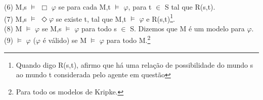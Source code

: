 \documentclass[12pt]{report}
\begin{document}
\indent (6) M,s $\vDash$ $\Box$ $\varphi$ se para cada M,t $\vDash$ $\varphi$, para t $\in$ S tal que 
R(s,t).\\
\indent (7) M,s $\vDash$ $\Diamond$$\varphi$ se existe t, tal que M,t $\vDash$ $\varphi$ e R(s,t)\footnote{Quando digo R(s,t), afirmo que há uma relação de possibilidade do mundo s ao mundo t considerada pelo agente em questão}.\\
\indent (8) M $\vDash$ $\varphi$ se M,s $\vDash$ $\varphi$ para todo s $\in$ S. Dizemos que M é um modelo para $\varphi$.\\
\indent (9) $\vDash$ $\varphi$ ($\varphi$ é válido) se M $\vDash$ $\varphi$ para todo M.\footnote{Para todo os modelos de Kripke.}\\
\end{document}
